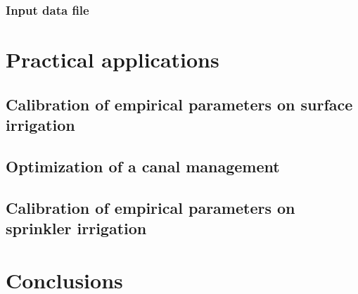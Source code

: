 \documentclass{article}
\begin{document}
\subsubsection{Input data file}

\section{Practical applications}

\subsection{Calibration of empirical parameters on surface irrigation}

\subsection{Optimization of a canal management}

\subsection{Calibration of empirical parameters on sprinkler irrigation}

\section{Conclusions}
\end{document}
